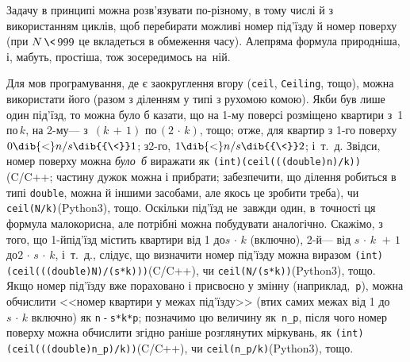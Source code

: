 \Tutorial	Задачу в принципі можна розв'язувати по-різному, в тому числі й з використанням циклів, щоб перебирати можливі номер під'їзду й номер поверху (при ${N\,{\<}\,999}$ це вкладеться в обмеження часу). Але\nolinebreak[3] пряма формула природніша, і, мабуть, простіша, тож зосередимось на~ній.

Для мов програмування, де є заокруглення вгору (\verb"ceil", \verb"Ceiling", тощо), можна використати його (разом з діленням у типі з рухомою комою). Якби був лише один під'їзд, то можна було б казати, що на \mbox{1-му} поверсі розміщено квартири з \textnumero$\,$1 по\nolinebreak[3] \textnumero$\,k$, на \mbox{2-му}\nolinebreak[3] --- з \textnumero$\,{(k\,{+}\,1)}$ по\nolinebreak[3] \textnumero$\,{(2\,{\cdot}\,k)}$, тощо; отже, для квартир з \mbox{1-го} поверху $0\dib{{<}}n/s\dib{{\<}}1$; з\nolinebreak[3] \mbox{2-го}, $1\dib{{<}}n/s\dib{{\<}}2$; і~т.~д. Звідси, номер поверху можна \emph{було~б} виражати як \verb"(int)(ceil(((double)n)/k))"\nolinebreak[2] (\mbox{C/C++}; частину дужок можна і прибрати; забезпечити, що ділення робиться в типі \texttt{double}, можна й іншими засобами, але якось це зробити треба), чи \verb"ceil(N/k)"\nolinebreak[3] (Python3), тощо. 
Оскільки під'їзд не~завжди один, в~точності ця формула малокорисна, але потрібні можна побудувати аналогічно. Скажімо, з того, що \mbox{1-й}\nolinebreak[2] під'їзд містить квартири від 1 до\nolinebreak[2] ${s\,{\cdot}\,k}$ (включно), \mbox{2-й}\nolinebreak[3] --- від ${s\,{\cdot}\,k\,\,{+}\,1}$ до\nolinebreak[2] ${2\,{\cdot}\,s\,{\cdot}\,k}$, і~т.~д., слідує, що визначити номер під'їзду можна виразом \verb"(int)(ceil(((double)N)/(s*k)))"\nolinebreak[2] \mbox{(C/C++)},\hspace{0pt plus 0.25em} чи\hspace{0pt plus 0.25em} \verb"ceil(N/(s*k))"\nolinebreak[3] \mbox{(Python3)}, тощо. Якщо номер під'їзду вже пораховано і присвоєно у змінну (наприклад,~\texttt{p}), можна обчислити <<номер квартири у межах під'їзду>> (в\nolinebreak[3] тих самих межах від 1 до\nolinebreak[2] ${s\,{\cdot}\,k}$ включно) як \verb"n"$\,$\verb"-"$\,$\verb"s*k*p"; позначимо цю величину як~\verb"n_p", після чого номер поверху можна обчислити згідно раніше розглянутих міркувань, як \verb"(int)(ceil(((double)n_p)/k))"\nolinebreak[2] \mbox{(C/C++)},\hspace{0pt plus 0.25em} чи\hspace{0pt plus 0.25em} \verb"ceil(n_p/k)"\nolinebreak[3] \mbox{(Python3)}, тощо.

